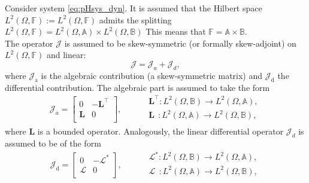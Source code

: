 \begin{assumption}
	\label{ass:linJ}
	Consider system \eqref{eq:pHsys_dyn}. It is assumed that the Hilbert space $L^2(\Omega, \mathbb{F}) := L^2(\Omega, \mathbb{F})$ admits the splitting $L^2(\Omega, \mathbb{F}) = L^2(\Omega, \mathbb{A}) \times L^2(\Omega, \mathbb{B})$  This means that $\mathbb{F} = \mathbb{A} \times \mathbb{B}$. \\
	
	The operator $\mathcal{J}$ is assumed to be skew-symmetric (or formally skew-adjoint) on $L^2(\Omega, \mathbb{F})$ and linear:
	\begin{equation}\label{eq:assJ}
	\mathcal{J} = \mathcal{J}_{{a}} + \mathcal{J}_{{d}},
	\end{equation}
	where $\mathcal{J}_{\text{a}}$ is the algebraic contribution (a skew-symmetric matrix) and $\mathcal{J}_{\text{d}}$ the differential contribution. The algebraic part is assumed to take the form
	\begin{equation}\label{eq:assJa}
		\mathcal{J}_{{a}} = \begin{bmatrix}
		0 & -\bm{L}^\top \\
		\bm{L} & 0 \\
		\end{bmatrix}, \qquad 
		\begin{aligned}
		&\bm{L}^\top : L^2(\Omega, \mathbb{B}) \rightarrow L^2(\Omega, \mathbb{A}), \\
		&\bm{L}\;\, : L^2(\Omega, \mathbb{A}) \rightarrow L^2(\Omega, \mathbb{B}), \\
		\end{aligned}
	\end{equation}
	where $\bm{L}$ is a bounded operator. 	Analogously, the linear differential operator $\mathcal{J}_{{d}}$ is assumed to be of the form
	\begin{equation}\label{eq:assJd}
	\mathcal{J}_{\text{d}} = 
	\begin{bmatrix}
	0 & -\mathcal{L}^* \\
	\mathcal{L} & 0 \\
	\end{bmatrix}, \qquad 
	\begin{aligned}
	&\mathcal{L}^* : L^2(\Omega, \mathbb{B}) \rightarrow L^2(\Omega, \mathbb{A}), \\
	&\mathcal{L}\;\, : L^2(\Omega, \mathbb{A}) \rightarrow L^2(\Omega, \mathbb{B}), \\
	\end{aligned}
	\end{equation}

\end{assumption}

